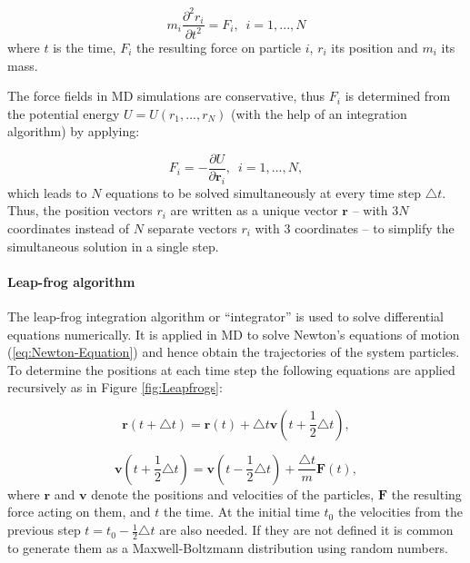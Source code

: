 \begin{equation}
m_{i}\frac{\partial^{2}{r}_{i}}{\partial t^{2}}={F}_{i},\enspace i=1,...,N\label{eq:Newton-Equation}
\end{equation}
where $t$ is the time, ${F}_{i}$ the resulting force on particle
$i$, ${r}_{i}$ its position and $m_{i}$ its mass.

The force fields in MD simulations are conservative, thus ${F}_{i}$
is determined from the potential energy $U=U(r_{1},...,r_{N})$ (with
the help of an integration algorithm) by applying:

\begin{equation}
{F}_{i}=-\frac{\partial U}{\partial\mathbf{r}_{i}},\enspace i=1,...,N,\label{eq:Force-PotEnergy-derivative}
\end{equation}
which leads to $N$ equations to be solved simultaneously at every
time step $\triangle t$. Thus, the position vectors ${r}_{i}$
are written as a unique vector $\mathbf{r}$ -- with $3N$ coordinates
instead of $N$ separate vectors ${r}_{i}$ with 3 coordinates
-- to simplify the simultaneous solution in a single step.

\paragraph{Leap-frog algorithm }

The leap-frog integration algorithm or ``integrator'' is used to
solve differential equations numerically. It is applied in MD to solve
Newton's equations of motion (\ref{eq:Newton-Equation}) and hence
obtain the trajectories of the system particles. To determine the
positions at each time step the following equations are applied recursively
as in Figure \ref{fig:Leapfrogs}:

\begin{equation}
\mathbf{r}(t+\triangle t)=\mathbf{r}(t)+\triangle t\mathbf{v}(t+\frac{1}{2}\triangle t),\label{eq:leapfrog-r}
\end{equation}

\begin{equation}
\mathbf{v}(t+\frac{1}{2}\triangle t)=\mathbf{\mathbf{v}}(t-\frac{1}{2}\triangle t)+\frac{\triangle t}{m}\mathbf{F}(t),\label{eq:leapfrog-v}
\end{equation}
where $\mathbf{r}$ and $\mathbf{v}$ denote the positions and velocities
of the particles, $\mathbf{F}$ the resulting force acting on them,
and $t$ the time. At the initial time $t_{0}$ the velocities from
the previous step $t=t_{0}-\frac{1}{2}\triangle t$ are also needed.
If they are not defined it is common to generate them as a Maxwell-Boltzmann
distribution using random numbers.

